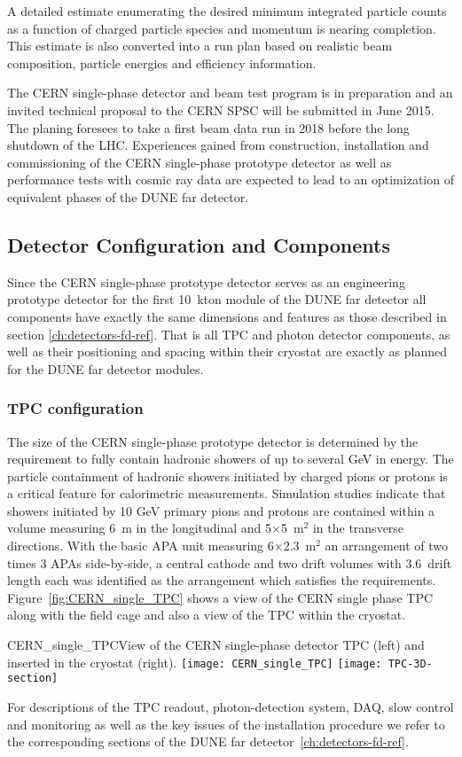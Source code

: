 A detailed estimate enumerating the desired minimum integrated
particle counts as a function of charged particle species and momentum
is nearing completion. This estimate is also converted into a run plan
based on realistic beam composition, particle energies and efficiency
information.

The CERN single-phase detector and beam test program is in preparation
and an invited technical proposal\cite{CERN_single-phase_proposal} to
the CERN SPSC will be submitted in June 2015. The planing foresees to
take a first beam data run in 2018 before the long shutdown of the
LHC. Experiences gained from construction, installation and
commissioning of the CERN single-phase prototype detector as well as
performance tests with cosmic ray data are expected to lead to an
optimization of equivalent phases of the DUNE far detector.

\subsection{Detector Configuration and Components}

Since the CERN single-phase prototype detector serves as an
engineering prototype detector for the first 10~kton module of the
DUNE far detector all components have exactly the same dimensions and
features as those described in section \ref{ch:detectors-fd-ref}. That
is all TPC and photon detector components, as well as their
positioning and spacing within their cryostat are exactly as planned
for the DUNE far detector modules.

\subsubsection{TPC configuration}

The size of the CERN single-phase prototype detector is determined by
the requirement to fully contain hadronic showers of up to several GeV
in energy.  The particle containment of hadronic showers initiated by
charged pions or protons is a critical feature for calorimetric
measurements. Simulation studies indicate that showers initiated by 10
GeV primary pions and protons are contained within a volume measuring
6~m in the longitudinal and 5$\times$5~m$^2$ in the transverse
directions. With the basic APA unit measuring 6$\times$2.3~m$^2$ an
arrangement of two times 3 APAs side-by-side, a central cathode and
two drift volumes with 3.6~drift length each was identified as the
arrangement which satisfies the
requirements. Figure~\ref{fig:CERN_single_TPC} shows a view of the
CERN single phase TPC along with the field cage and also a view of the
TPC within the cryostat.
%
\begin{cdrfigure}{CERN_single_TPC}{View of the CERN 
single-phase detector TPC (left) and inserted in the cryostat (right). }
\texttt{[image: CERN\_single\_TPC]}
\texttt{[image: TPC-3D-section]}
\end{cdrfigure}
%
For descriptions of the TPC readout, photon-detection system, DAQ,
slow control and monitoring as well as the key issues of the
installation procedure we refer to the corresponding sections of the
DUNE far detector~\ref{ch:detectors-fd-ref}.

